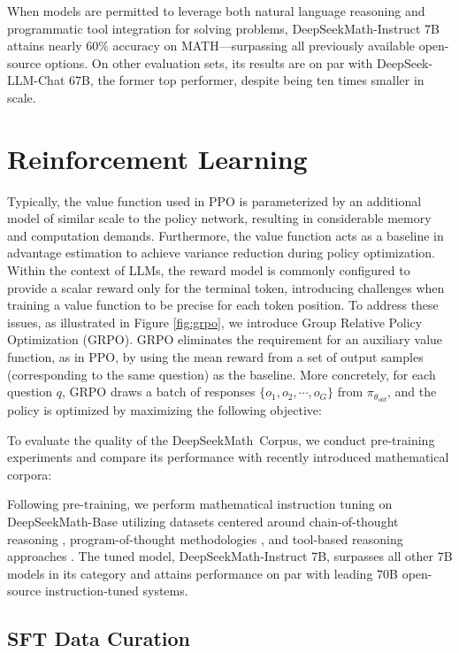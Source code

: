 \begin{itemize}[topsep=0pt]
When models are permitted to leverage both natural language reasoning and programmatic tool integration for solving problems, DeepSeekMath-Instruct 7B attains nearly 60\% accuracy on MATH—surpassing all previously available open-source options. On other evaluation sets, its results are on par with DeepSeek-LLM-Chat 67B, the former top performer, despite being ten times smaller in scale.
\section{Reinforcement Learning}

Typically, the value function used in PPO is parameterized by an additional model of similar scale to the policy network, resulting in considerable memory and computation demands. Furthermore, the value function acts as a baseline in advantage estimation to achieve variance reduction during policy optimization. Within the context of LLMs, the reward model is commonly configured to provide a scalar reward only for the terminal token, introducing challenges when training a value function to be precise for each token position. To address these issues, as illustrated in Figure \ref{fig:grpo}, we introduce Group Relative Policy Optimization (GRPO). GRPO eliminates the requirement for an auxiliary value function, as in PPO, by using the mean reward from a set of output samples (corresponding to the same question) as the baseline. More concretely, for each question $q$, GRPO draws a batch of responses $\{o_1, o_2, \cdots, o_G\}$ from $\pi_{\theta_{old}}$, and the policy is optimized by maximizing the following objective:

To evaluate the quality of the DeepSeekMath~Corpus, we conduct pre-training experiments and compare its performance with recently introduced mathematical corpora:

Following pre-training, we perform mathematical instruction tuning on DeepSeekMath-Base utilizing datasets centered around chain-of-thought reasoning \citep{cot}, program-of-thought methodologies \citep{pot,pal}, and tool-based reasoning approaches \citep{tora}. The tuned model, DeepSeekMath-Instruct 7B, surpasses all other 7B models in its category and attains performance on par with leading 70B open-source instruction-tuned systems.

\subsection{SFT Data Curation}


\end{itemize}
